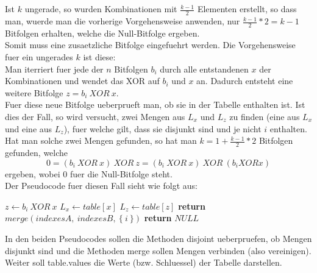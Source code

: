\documentclass[a4paper,10pt,ngerman]{scrartcl}
\begin{document}
\\\\
Ist $k$ ungerade, so wurden Kombinationen mit $\frac{k-1}{2}$ Elementen erstellt, so dass man, wuerde man die vorherige Vorgehensweise anwenden, nur $\frac{k-1}{2} * 2 = k-1$ Bitfolgen erhalten, welche die Null-Bitfolge ergeben. \\
Somit muss eine zusaetzliche Bitfolge eingefuehrt werden. Die Vorgehensweise fuer ein ungerades $k$ ist diese:\\
Man iterriert fuer jede der $n$ Bitfolgen $b_i$ durch alle entstandenen $x$ der Kombinationen und wendet das XOR auf $b_i$ und $x$ an. Dadurch entsteht eine weitere Bitfolge $z = b_i \ XOR \ x$.\\
Fuer diese neue Bitfolge ueberprueft man, ob sie in der Tabelle enthalten ist. Ist dies der Fall, so wird versucht, zwei Mengen aus $L_x$ und $L_z$ zu finden (eine aus $L_x$ und eine aus $L_z$), fuer welche gilt, dass sie disjunkt sind und je nicht $i$ enthalten.\\
Hat man solche zwei Mengen gefunden, so hat man $k = 1 + \frac{k-1}{2} * 2$ Bitfolgen gefunden, welche
$$
0 = (b_i \ XOR \ x) \ XOR \ z = (b_i \ XOR \ x) \ XOR \ (b_i XOR x)
$$
ergeben, wobei $0$ fuer die Null-Bitfolge steht.\\
Der Pseudocode fuer diesen Fall sieht wie folgt aus:
\begin{algorithmic}[1]
							\State $z \gets b_i \ XOR \ x$
							\State $L_x \gets table[x]$
							\State $L_z \gets table[z]$
																\State \textbf{return} $merge(indexesA, \ indexesB, \ \{ \ i \ \})$
													\EndIf
											\EndFor
									\EndFor
							\EndIf
				\EndFor
		\EndFor
		\State \textbf{return} $NULL$
\EndProcedure
\end{algorithmic}

In den beiden Pseudocodes sollen die Methoden disjoint ueberpruefen, ob Mengen disjunkt sind und die Methoden merge sollen Mengen verbinden (also vereinigen). \\
Weiter soll table.values die Werte (bzw. Schluessel) der Tabelle darstellen.
\end{document}
